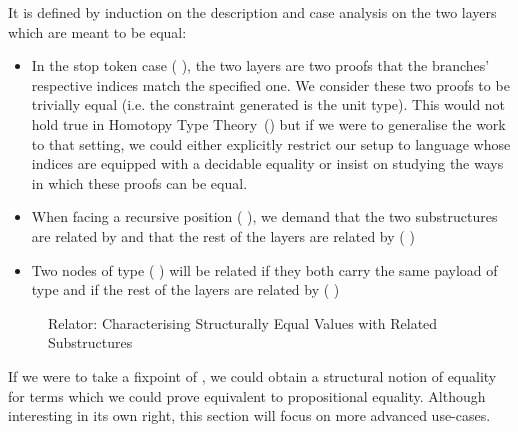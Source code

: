 It is defined by induction on the description and case analysis on the two
layers which are meant to be equal:
\begin{itemize}
\item In the stop token case {( )}, the two layers are two proofs
    that the branches' respective indices match the specified one. We consider
    these two proofs to be trivially equal (i.e. the constraint generated is the
    unit type).
    This would not hold true in Homotopy Type Theory~(\cite{hottbook})
    but if we were to generalise the work to that setting, we could either explicitly
    restrict our setup to language whose indices are equipped with a decidable equality
    or insist on studying the ways in which these proofs can be equal.
  \item When facing a recursive position {(   )}, we
    demand that the two substructures are related by {  }
    and that the rest of the layers are related by (   )
  \item Two nodes of type {(  )} will
    be related if they both carry the same payload  of type  and if
    the rest of the layers are related by (    )
\end{itemize}

\begin{figure}[h]
\caption{Relator: Characterising Structurally Equal Values with Related Substructures\label{fig:zip-rel}}
\end{figure}

If we were to take a fixpoint of , we could obtain a structural
notion of equality for terms which we could prove equivalent to propositional
equality. Although interesting in its own right, this section will focus
on more advanced use-cases.




